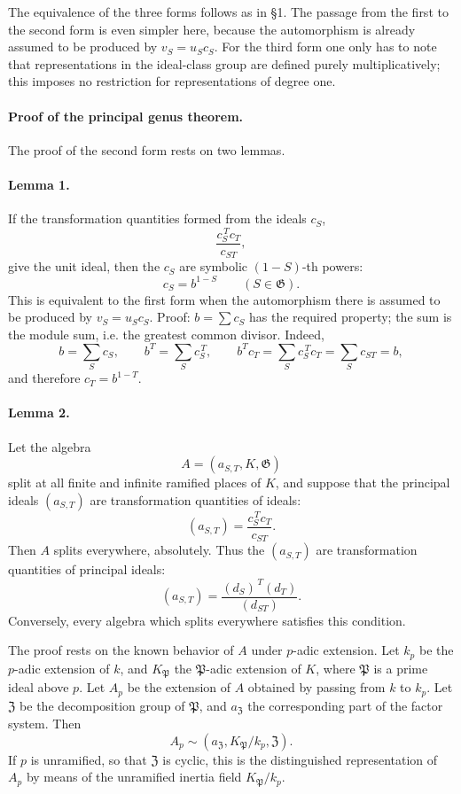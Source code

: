 \documentclass[11pt]{article}
\providecommand{\Gg}{\mathfrak G}
\providecommand{\PP}{\mathfrak P}
\begin{document}
The equivalence of the three forms follows as in §1. The passage from the first to the second form is even simpler here, because the automorphism is already assumed to be produced by \(v_S=u_Sc_S\). For the third form one only has to note that representations in the ideal-class group are defined purely multiplicatively; this imposes no restriction for representations of degree one.

\paragraph{Proof of the principal genus theorem.}
The proof of the second form rests on two lemmas.

\paragraph{Lemma 1.}
If the transformation quantities formed from the ideals \(c_S\),
\[
        \frac{c_S^{\,T}c_T}{c_{ST}},
\]
give the unit ideal, then the \(c_S\) are symbolic \((1-S)\)-th powers:
\[
        c_S=b^{1-S}\qquad(S\in\Gg).
\]
This is equivalent to the first form when the automorphism there is assumed to be produced by \(v_S=u_Sc_S\). Proof: \(b=\sum c_S\) has the required property; the sum is the module sum, i.e. the greatest common divisor. Indeed,
\[
        b=\sum_S c_S,\qquad
        b^T=\sum_S c_S^{\,T},\qquad
        b^T c_T=\sum_S c_S^{\,T}c_T=\sum_S c_{ST}=b,
\]
and therefore \(c_T=b^{1-T}\).

\paragraph{Lemma 2.}
Let the algebra
\[
        A=(a_{S,T},K,\Gg)
\]
split at all finite and infinite ramified places of \(K\), and suppose that the principal ideals \((a_{S,T})\) are transformation quantities of ideals:
\[
        (a_{S,T})=\frac{c_S^{\,T}c_T}{c_{ST}}.
\]
Then \(A\) splits everywhere, absolutely. Thus the \((a_{S,T})\) are transformation quantities of principal ideals:
\[
        (a_{S,T})=\frac{(d_S)^{\,T}(d_T)}{(d_{ST})}.
\]
Conversely, every algebra which splits everywhere satisfies this condition.

The proof rests on the known behavior of \(A\) under \(p\)-adic extension. Let \(k_p\) be the \(p\)-adic extension of \(k\), and \(K_\PP\) the \(\PP\)-adic extension of \(K\), where \(\PP\) is a prime ideal above \(p\). Let \(A_p\) be the extension of \(A\) obtained by passing from \(k\) to \(k_p\). Let \(\mathfrak Z\) be the decomposition group of \(\PP\), and \(a_{\mathfrak Z}\) the corresponding part of the factor system. Then
\[
        A_p\sim (a_{\mathfrak Z},K_\PP/k_p,\mathfrak Z).
\]
If \(p\) is unramified, so that \(\mathfrak Z\) is cyclic, this is the distinguished representation of \(A_p\) by means of the unramified inertia field \(K_\PP/k_p\).
\end{document}
